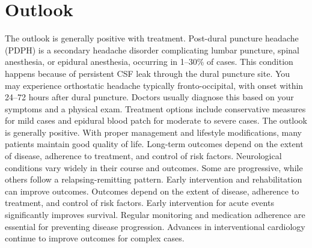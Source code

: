 \section{Outlook}
The outlook is generally positive with treatment. Post-dural puncture headache (PDPH) is a secondary headache disorder complicating lumbar puncture, spinal anesthesia, or epidural anesthesia, occurring in 1--30\% of cases. This condition happens because of persistent CSF leak through the dural puncture site. You may experience orthostatic headache typically fronto-occipital, with onset within 24--72 hours after dural puncture. Doctors usually diagnose this based on your symptoms and a physical exam. Treatment options include conservative measures for mild cases and epidural blood patch for moderate to severe cases. The outlook is generally positive. With proper management and lifestyle modifications, many patients maintain good quality of life. Long-term outcomes depend on the extent of disease, adherence to treatment, and control of risk factors. Neurological conditions vary widely in their course and outcomes. Some are progressive, while others follow a relapsing-remitting pattern. Early intervention and rehabilitation can improve outcomes. Outcomes depend on the extent of disease, adherence to treatment, and control of risk factors. Early intervention for acute events significantly improves survival. Regular monitoring and medication adherence are essential for preventing disease progression. Advances in interventional cardiology continue to improve outcomes for complex cases.
